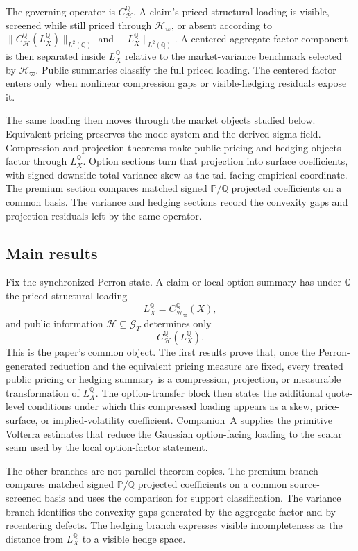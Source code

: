 \documentclass[11pt,a4paper]{amsart}
\theoremstyle{plain}
\theoremstyle{definition}
\theoremstyle{remark}
\newcommand{\PP}{\mathbb{P}}
\newcommand{\QQ}{\mathbb{Q}}
\newcommand{\cG}{\mathcal{G}}
\newcommand{\cH}{\mathcal{H}}
\begin{document}
The governing operator is \(C_{\cH}^{\QQ}\).  A claim's priced structural loading is visible,
screened while still priced through \(\cH_\varpi\), or absent according to
\(\|C_{\cH}^{\QQ}(L_X^\QQ)\|_{L^2(\QQ)}\) and \(\|L_X^\QQ\|_{L^2(\QQ)}\).  A centered aggregate-factor
component is then separated inside \(L_X^\QQ\) relative to the market-variance benchmark selected
by \(\cH_\varpi\).  Public summaries classify the full priced loading.  The centered factor enters
only when nonlinear compression gaps or visible-hedging residuals expose it.

The same loading then moves through the market objects studied below.  Equivalent pricing preserves
the mode system and the derived sigma-field.  Compression and projection theorems make public
pricing and hedging objects factor through \(L_X^\QQ\).  Option sections turn that projection into
surface coefficients, with signed downside total-variance skew as the tail-facing empirical
coordinate.  The premium section compares matched signed \(\PP/\QQ\) projected coefficients on a
common basis.  The variance and hedging sections record the convexity gaps and projection residuals
left by the same operator.

\subsection*{Main results}
Fix the synchronized Perron state.  A claim or local option summary has under \(\QQ\) the priced
structural loading
\[
        L_X^\QQ=C_{\cH_\varpi}^{\QQ}(X),
\]
and public information \(\cH\subseteq\cG_T\) determines only
\[
        C_{\cH}^{\QQ}(L_X^\QQ).
\]
This is the paper's common object.  The first results prove that, once the Perron-generated
reduction and the equivalent pricing measure are fixed, every treated public pricing or hedging
summary is a compression, projection, or measurable transformation of \(L_X^\QQ\).  The
option-transfer block then states the additional quote-level conditions under which this compressed
loading appears as a skew, price-surface, or implied-volatility coefficient.  Companion~A supplies
the primitive Volterra estimates that reduce the Gaussian option-facing loading to the scalar seam
used by the local option-factor statement.

The other branches are not parallel theorem copies.  The premium branch compares matched signed
\(\PP/\QQ\) projected coefficients on a common source-screened basis and uses the comparison for
support classification.  The variance branch identifies the convexity gaps generated by the
aggregate factor and by recentering defects.  The hedging branch expresses visible incompleteness as
the distance from \(L_X^\QQ\) to a visible hedge space.
\end{document}
